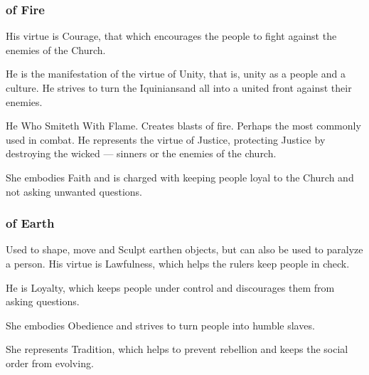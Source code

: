 \subsubsection{\Sephiroth{} of Fire}
\begin{sephlist}
  \seph{\Barion{}}
    His virtue is Courage, that which encourages the people to fight against the enemies of the Church.
  
  \seph{\Hapheron{}}
    He is the manifestation of the virtue of Unity, that is, unity as a people and a culture. He strives to turn the Iquinians\dash and all \humans\dash into a united front against their enemies. 
  
  \seph{\Izion{}}
    He Who Smiteth With Flame. Creates blasts of fire. Perhaps the \Sephirah{} most commonly used in combat. He represents the virtue of Justice, protecting Justice by destroying the wicked --- sinners or the enemies of the church. 
  
  \seph{\Teshiron{}}
    She embodies Faith and is charged with keeping people loyal to the Church and not asking unwanted questions. 

\end{sephlist}

\subsubsection{\Sephiroth{} of Earth}
\begin{sephlist}
  \seph{\Cushed{}}
    Used to shape, move and Sculpt earthen objects, but can also be used to paralyze a person. His virtue is Lawfulness, which helps the rulers keep people in check. 
  
  \seph{\Hoshied{}}
    He is Loyalty, which keeps people under control and discourages them from asking questions. 
  
  \seph{\Thimared{}}
    She embodies Obedience and strives to turn people into humble slaves. 
  
  \seph{\Yemared{}}
    She represents Tradition, which helps to prevent rebellion and keeps the social order from evolving. 

\end{sephlist}

